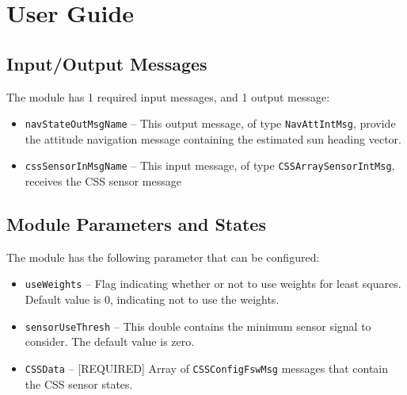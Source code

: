 
\section{User Guide}
\subsection{Input/Output Messages}
The module has 1 required input messages, and 1 output message:
\begin{itemize}
	\item {\tt navStateOutMsgName} -- This output message, of type {\tt NavAttIntMsg}, provide the attitude navigation message containing the estimated sun heading vector.
	\item {\tt cssSensorInMsgName} -- This input message, of type {\tt CSSArraySensorIntMsg}, receives the CSS sensor message
\end{itemize}

\subsection{Module Parameters and States}
The module has the following parameter that can be configured:
\begin{itemize}
	\item {\tt useWeights} -- Flag indicating whether or not to use weights for least squares.  Default value is 0, indicating not to use the weights.
	
	\item {\tt sensorUseThresh} -- This double contains the minimum sensor signal to consider.     The default value is zero. 
	
	\item {\tt CSSData} -- [REQUIRED] Array of {\tt CSSConfigFswMsg} messages that contain the CSS sensor states.	
\end{itemize}

